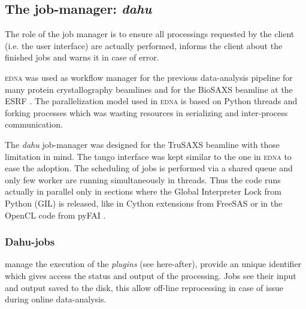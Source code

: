 \documentclass[preprint]{iucr}              %
\begin{document}
\subsection{The job-manager: \textit{dahu}}

The role of the job manager is to ensure all processings requested by the client (i.e. the user interface) are actually performed, informs the client about the finished jobs and warns it in case of error.

\textsc{edna} was used as workflow manager for the previous data-analysis pipeline for many protein crystallography beamlines \cite{edna} and for the BioSAXS beamline at the ESRF \cite{BM29ODA}.
The parallelization model used in \textsc{edna} is based on Python threads and forking processes which was wasting resources in serializing and inter-process communication. 
 
The \textit{dahu} job-manager was designed for the TruSAXS beamline \cite{id02_2022} with those limitation in mind. 
The tango interface \cite{tango} was kept similar to the one in \textsc{edna} to ease the adoption.
The scheduling of jobs is performed via a shared queue and only few worker are running simultaneously in threads.
Thus the code runs actually in parallel only in sections where the Global Interpreter Lock from Python (GIL) is released, like in Cython extensions from FreeSAS or in the OpenCL code from pyFAI \cite{pyFAI_gpu}.

\subsubsection{Dahu-jobs}
manage the execution of the \textit{plugins} (see here-after), provide an unique identifier which gives access the status and output of the processing.
Jobs see their input and output saved to the disk, this allow off-line reprocessing in case of issue during online data-analysis.
\end{document}

